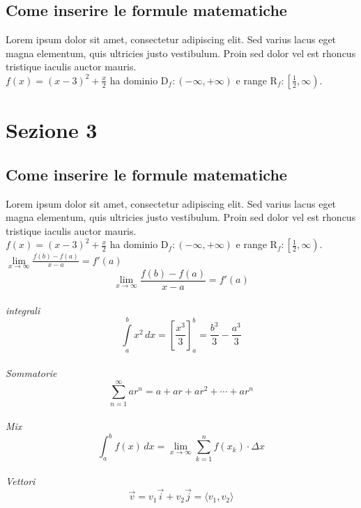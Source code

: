 \documentclass[11pt, landscape]{article}
\begin{document}
\subsection{Come inserire le formule matematiche}
Lorem ipsum dolor sit amet, consectetur adipiscing elit. Sed varius lacus eget magna elementum, quis ultricies justo vestibulum. Proin sed dolor vel est rhoncus tristique iaculis auctor mauris.\\[3mm]
$f(x)=(x-3)^2+ \displaystyle \frac{x}{2}$ ha dominio $\mathrm{D}_f:(-\infty,+\infty)$
e range $\mathrm{R}_f:\left[\frac{1}{2},\infty\right)$.\\


\section{Sezione 3}

\subsection{Come inserire le formule matematiche}
Lorem ipsum dolor sit amet, consectetur adipiscing elit. Sed varius lacus eget magna elementum, quis ultricies justo vestibulum. Proin sed dolor vel est rhoncus tristique iaculis auctor mauris.\\[3mm]
$f(x)=(x-3)^2+ \displaystyle \frac{x}{2}$ ha dominio $\mathrm{D}_f:(-\infty,+\infty)$
e range $\mathrm{R}_f:\left[\frac{1}{2},\infty\right)$.\\

$\displaystyle{\lim \limits_{x \to \infty} \frac{f(b)-f(a)}{x-a}=f'(a)}$\\[1cm]

\begin{equation}
	\displaystyle{\lim \limits_{x \to \infty} \frac{f(b)-f(a)}{x-a}=f'(a)}
\end{equation}\\[1cm]
\emph{integrali}
\begin{equation}
	\displaystyle{\int \limits_{a}^{b}x^2 \,dx=\left[\frac{x^3}{3}\right]_{a}^{b}=\frac{b^3}{3}-\frac{a^3}{3}}
\end{equation}\\[1cm]
\emph{Sommatorie}
\begin{equation}
	\displaystyle{\sum \limits_{n=1}^{\infty}ar^n=a+ar+ar^2+\cdots+ar^n}
\end{equation}\\[1cm]
\emph{Mix}
\begin{equation}
	\displaystyle{\int_a^b{f(x) \,dx=\lim \limits_{x \to \infty} \sum \limits_{k=1}^{n}f(x_k) \cdot \Delta x}}
\end{equation}\\[1cm]
\emph{Vettori}
\begin{equation}
	\displaystyle{\vec{v}=v_1 \vec{i}+v_2 \vec{j}=\langle v_1, v_2 \rangle}
\end{equation}\\[1cm]
\end{document}

